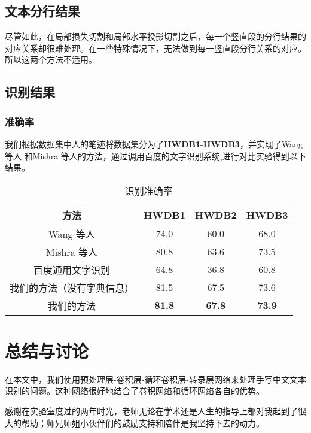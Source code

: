 \documentclass[winfonts]{njuthesis}
\begin{document}
\section{文本分行结果}
尽管如此，在局部损失切割和局部水平投影切割之后，每一个竖直段的分行结果的对应关系却很难处理。在一些特殊情况下，无法做到每一竖直段分行关系的对应。所以这两个方法不适用。




\section{识别结果}

\subsection{准确率}
我们根据数据集中人的笔迹将数据集分为了\textbf{HWDB1}-\textbf{HWDB3}，并实现了Wang 等人\cite{wang2012end} 和Mishra 等人\cite{mishra2012scene}的方法，通过调用百度的文字识别系统\cite{baiduapi},进行对比实验得到以下结果。

\vspace{0.2cm}
\begin{table}[htbp]
\setlength{\belowcaptionskip}{5pt}
  \centering
  \begin{tabular}{cccc}
    \toprule
    \textbf{方法} & \textbf{HWDB1} & \textbf{HWDB2} & \textbf{HWDB3} \\
    \midrule
    Wang 等人\cite{wang2012end}   			& 74.0 & 60.0 & 68.0  \\
    Mishra 等人\cite{mishra2012scene}		 	& 80.8 & 63.6 & 73.5  \\
    百度通用文字识别\cite{baiduapi}		& 64.8 & 36.8 & 60.8 \\
    \midrule
    我们的方法（没有字典信息）& 81.5 & 67.5 & 73.6  \\
    我们的方法	  		& \textbf{81.8} & \textbf{67.8} & \textbf{73.9}  \\
    \bottomrule
  \end{tabular}
  \vspace{0.2cm}
  \caption{识别准确率}\label{table:result}
\end{table}



\chapter{总结与讨论}
在本文中，我们使用预处理层-卷积层-循环卷积层-转录层网络来处理手写中文文本识别的问题。这种网络很好地结合了卷积网络和循环网络各自的优势。



\begin{acknowledgement}
感谢在实验室度过的两年时光，老师无论在学术还是人生的指导上都对我起到了很大的帮助；师兄师姐小伙伴们的鼓励支持和陪伴是我坚持下去的动力。
\end{acknowledgement}

\end{document}
